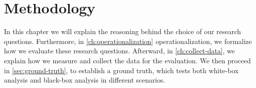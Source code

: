 \chapter{Methodology}\label{ch:methodology}

In this chapter we will explain the reasoning behind the choice of our research questions. 
Furthermore, in \autoref{ch:operationalization} operationalization, we formalize how we evaluate these research questions. Afterward,
in \autoref{ch:collect-data}, we explain how we measure and collect the data for the evaluation.
We then proceed in \autoref{sec:ground-truth}, to establish a ground truth, which tests both white-box analysis and black-box analysis in 
different scenarios.


